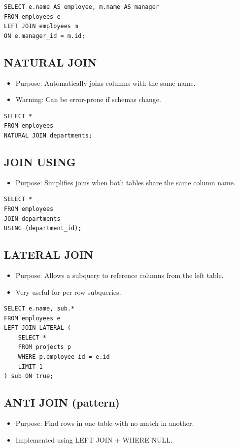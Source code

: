 \documentclass[10pt]{article}
\begin{document}
\begin{verbatim}
SELECT e.name AS employee, m.name AS manager
FROM employees e
LEFT JOIN employees m
ON e.manager_id = m.id;
\end{verbatim}

\subsection{NATURAL JOIN}
\begin{itemize}
    \item Purpose: Automatically joins columns with the same name.
    \item Warning: Can be error-prone if schemas change.
\end{itemize}

\begin{verbatim}
SELECT *
FROM employees
NATURAL JOIN departments;
\end{verbatim}

\subsection{JOIN USING}
\begin{itemize}
    \item Purpose: Simplifies joins when both tables share the same column name.
\end{itemize}

\begin{verbatim}
SELECT *
FROM employees
JOIN departments
USING (department_id);
\end{verbatim}

\subsection{LATERAL JOIN}
\begin{itemize}
    \item Purpose: Allows a subquery to reference columns from the left table.
    \item Very useful for per-row subqueries.
\end{itemize}

\begin{verbatim}
SELECT e.name, sub.*
FROM employees e
LEFT JOIN LATERAL (
    SELECT *
    FROM projects p
    WHERE p.employee_id = e.id
    LIMIT 1
) sub ON true;
\end{verbatim}

\subsection{ANTI JOIN (pattern)}
\begin{itemize}
    \item Purpose: Find rows in one table with no match in another.
    \item Implemented using LEFT JOIN + WHERE NULL.
\end{itemize}
\end{document}
